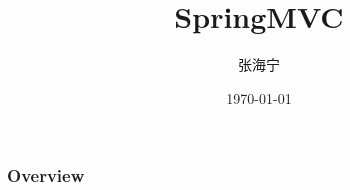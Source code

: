 \documentclass{beamer}
\title[SpringMVC]{SpringMVC} %
\author{张海宁} %
\institute[Guizhou University] %
{
贵州大学 \\ %
\medskip
\textit{hnzhang1@gzu.edu.cn} %
}
\date{\today} %
\begin{document}
\begin{frame}
\titlepage %
\end{frame}

\begin{frame}
\frametitle{Overview} %
\tableofcontents %
\end{frame}


\end{document}
